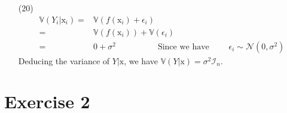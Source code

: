 \documentclass[12pt,a4paper]{article}
\begin{document}
\begin{enumerate}
    \item[(20)] 
      \begin{align*}
       \mathbb{V}(Y_i|\mathrm{x}_i)=& \mathbb{V}(f(\mathrm{x}_i)+\epsilon_i)\\
       =& \mathbb{V}(f(\mathrm{x}_i))+\mathbb{V}(\epsilon_i)\\
       =& 0+\sigma ^2   \quad \quad \quad \quad \quad \text{Since we have } \quad \quad \epsilon_i \sim \mathcal{N}(0,\sigma^2)
   \end{align*}
   Deducing the variance of $Y|\mathrm{x}$, we have $\mathbb{V}(Y|\mathrm{x})=\sigma^2\mathcal{I}_n$.
\end{enumerate}

\section*{Exercise 2}
\end{document}
